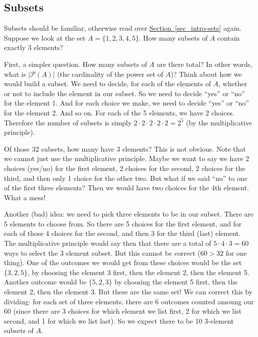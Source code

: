 \documentclass[10pt,]{book}
\theoremstyle{plain}
\theoremstyle{definition}
\theoremstyle{definition}
\theoremstyle{definition}
\numberwithin{equation}{section}
\def\pow{\mathcal P}
\begin{document}
\subsection[Subsets]{Subsets}\label{subsection-12}

        Subsets should be familiar, otherwise read over
        \hyperref[sec_intro-sets]{Section~\ref{sec_intro-sets}} again. Suppose we look at the set \(A = \{1,2,3,4,5\}\). How many subsets of \(A\) contain exactly 3 elements?
\par

        First, a simpler question. How many subsets of \(A\) are there total? In other words, what is \(|\pow(A)|\) (the cardinality of the power set of \(A\))? Think about how we would build a subset. We need to decide, for each of the elements of \(A\), whether or not to include the element in our subset. So we need to decide ``yes'' or ``no'' for the element 1. And for each choice we make, we need to decide ``yes'' or ``no'' for the element 2. And so on. For each of the 5 elements, we have 2 choices. Therefore the number of subsets is simply \(2\cdot 2\cdot 2 \cdot 2\cdot 2 = 2^5\) (by the multiplicative principle).
\par

        Of those 32 subsets, how many have 3 elements? This is not obvious. Note that we cannot just use the multiplicative principle. Maybe we want to say we have 2 choices (yes/no) for the first element, 2 choices for the second, 2 choices for the third, and then only 1 choice for the other two. But what if we said ``no'' to one of the first three elements? Then we would have two choices for the 4th element. What a mess!
\par

        Another (bad) idea: we need to pick three elements to be in our subset. There are 5 elements to choose from. So there are 5 choices for the first element, and for each of those 4 choices for the second, and then 3 for the third (last) element. The multiplicative principle would say then that there are a total of \(5 \cdot 4 \cdot 3 = 60\) ways to select the 3 element subset. But this cannot be correct (\(60 > 32\) for one thing). One of the outcomes we would get from these choices would be the set \(\{3,2,5\}\), by choosing the element 3 first, then the element 2, then the element 5. Another outcome would be \(\{5,2,3\}\) by choosing the element 5 first, then the element 2, then the element 3. But these are the same set! We can correct this by dividing: for each set of three elements, there are 6 outcomes counted amoung our 60 (since there are 3 choices for which element we list first, 2 for which we list second, and 1 for which we list last). So we expect there to be
        10 3-element subsets of \(A\).
\par
\end{document}
